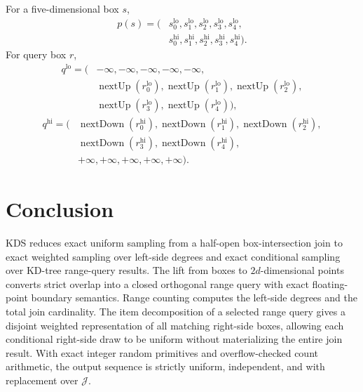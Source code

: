 \documentclass[11pt]{article}
\theoremstyle{definition}
\theoremstyle{plain}
\theoremstyle{remark}
\DeclareMathOperator{\nextUp}{nextUp}
\DeclareMathOperator{\nextDown}{nextDown}
\newcommand{\Jset}{\mathcal J}
\newcommand{\lo}{\mathrm{lo}}
\newcommand{\hi}{\mathrm{hi}}
\begin{document}
For a five-dimensional box $s$,
\[
\begin{aligned}
  p(s)=(&s_0^{\lo},s_1^{\lo},s_2^{\lo},s_3^{\lo},s_4^{\lo},\\
        &s_0^{\hi},s_1^{\hi},s_2^{\hi},s_3^{\hi},s_4^{\hi}).
\end{aligned}
\]
For query box $r$,
\[
\begin{aligned}
  q^{\lo}=(&-\infty,-\infty,-\infty,-\infty,-\infty,\\
            &\nextUp(r_0^{\lo}),\nextUp(r_1^{\lo}),\nextUp(r_2^{\lo}),\\
            &\nextUp(r_3^{\lo}),\nextUp(r_4^{\lo})),
\end{aligned}
\]
\[
\begin{aligned}
  q^{\hi}=(&\nextDown(r_0^{\hi}),\nextDown(r_1^{\hi}),\nextDown(r_2^{\hi}),\\
            &\nextDown(r_3^{\hi}),\nextDown(r_4^{\hi}),\\
            &+\infty,+\infty,+\infty,+\infty,+\infty).
\end{aligned}
\]

\section{Conclusion}

KDS reduces exact uniform sampling from a half-open box-intersection join to exact weighted
sampling over left-side degrees and exact conditional sampling over KD-tree range-query
results.  The lift from boxes to $2d$-dimensional points converts strict overlap into a
closed orthogonal range query with exact floating-point boundary semantics.  Range counting
computes the left-side degrees and the total join cardinality.  The item decomposition of a
selected range query gives a disjoint weighted representation of all matching right-side
boxes, allowing each conditional right-side draw to be uniform without materializing the
entire join result.  With exact integer random primitives and overflow-checked count
arithmetic, the output sequence is strictly uniform, independent, and with replacement over
$\Jset$.
\end{document}
